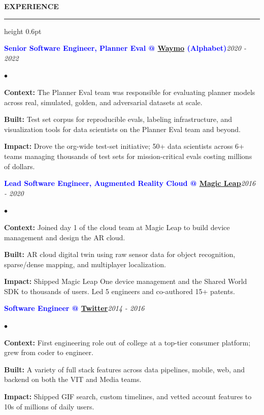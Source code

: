 \documentclass[10pt]{resume}
\newenvironment{rSectionCompact}[1]{
  \medskip
  \vspace{0.45em}
  \textbf{\textcolor{Cerulean}{\MakeUppercase{#1}}}
  \vspace{0.3em}
  {\color{Blue}\hrule height 0.6pt}
  \vspace{0.85em}
  \begin{list}{}{
    \setlength{\leftmargin}{0em}
  }
  \item[]
}{
    \vspace{0.25em}
    \end{list}
}
\newenvironment{rJobCompact}[2]{
  \normalsize
  \textcolor{Blue}{\textbf{#1}}\hfill\textit{#2}
  \vspace{0.08em}
  \begin{list}{$\bullet$}{
    \setlength{\leftmargin}{1.6em}
    \setlength{\itemsep}{-0.05em}
    \setlength{\topsep}{0pt}
    \setlength{\partopsep}{0pt}
    \setlength{\parsep}{0pt}
  }
}{
    \end{list}
    \vspace{0.35em}
}
\begin{document}
\begin{rSectionCompact}{Experience}
    \begin{rJobCompact}{Senior Software Engineer, Planner Eval @ \href{https://waymo.com}{Waymo} (Alphabet)}{2020 - 2022}
        \item \textbf{Context:} The Planner Eval team was responsible for evaluating planner models across real, simulated, golden, and adversarial datasets at scale.
        \item \textbf{Built:} Test set corpus for reproducible evals, labeling infrastructure, and visualization tools for data scientists on the Planner Eval team and beyond.
        \item \textbf{Impact:} Drove the org-wide test-set initiative; 50+ data scientists across 6+ teams managing thousands of test sets for mission-critical evals costing millions of dollars.
    \end{rJobCompact}

    \begin{rJobCompact}{Lead Software Engineer, Augmented Reality Cloud @ \href{https://magicleap.com}{Magic Leap}}{2016 - 2020}
        \item \textbf{Context:} Joined day 1 of the cloud team at Magic Leap to build device management and design the AR cloud.
        \item \textbf{Built:} AR cloud digital twin using raw sensor data for object recognition, sparse/dense mapping, and multiplayer localization.
        \item \textbf{Impact:} Shipped Magic Leap One device management and the Shared World SDK to thousands of users. Led 5 engineers and co-authored 15+ patents.
    \end{rJobCompact}

    \begin{rJobCompact}{Software Engineer @ \href{https://twitter.com}{Twitter}}{2014 - 2016}
        \item \textbf{Context:} First engineering role out of college at a top-tier consumer platform; grew from coder to engineer.
        \item \textbf{Built:} A variety of full stack features across data pipelines, mobile, web, and backend on both the VIT and Media teams.
        \item \textbf{Impact:} Shipped GIF search, custom timelines, and vetted account features to 10s of millions of daily users.
    \end{rJobCompact}

\end{rSectionCompact}
\end{document}
